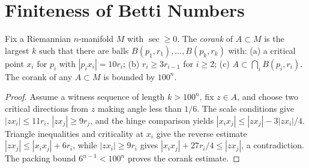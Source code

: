\section{Finiteness of Betti Numbers}

\begin{lemma}
  \label{lem:pet-ch12-corank-bound}

  Fix a Riemannian $n$-manifold $M$ with $\sec\ge0$. The \emph{corank} of
  $A\subset M$ is the largest $k$ such that there are balls
  $B(p_1,r_1),\dots,B(p_k,r_k)$ with: (a) a critical point $x_i$ for $p_i$ with
  $|p_ix_i|=10r_i$; (b) $r_i\ge3r_{i-1}$ for $i\ge2$; (c)
  $A\subset\bigcap_iB(p_i,r_i)$. The corank of any $A\subset M$ is bounded by
  $100^n$.
\end{lemma}
\begin{proof}
  \sketch
  Assume a witness sequence of length \(k>100^n\), fix \(z\in A\), and choose
  two critical directions from \(z\) making angle less than \(1/6\). The scale
  conditions give \( |zx_i|\le11r_i\), \( |zx_j|\ge9r_j\), and the hinge
  comparison yields \( |x_ix_j|\le|zx_j|-3|zx_i|/4\). Triangle inequalities
  and criticality at \(x_i\) give the reverse estimate
  \( |zx_j|\le|x_ix_j|+6r_i\), while \( |zx_i|\ge9r_i\) gives
  \( |x_ix_j|+27r_i/4\le|zx_j|\), a contradiction. The packing bound
  \(6^{n-1}<100^n\) proves the corank estimate.
\end{proof}

